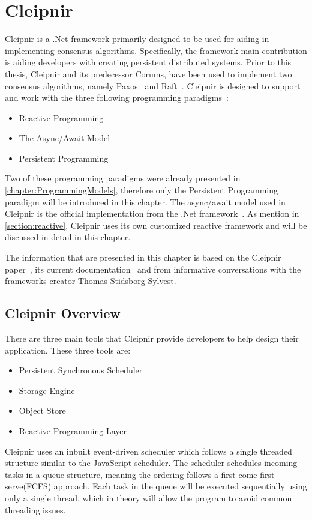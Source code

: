 \chapter{Cleipnir}
\label{chapter:Cleipnir}

Cleipnir is a .Net framework primarily designed to be used for aiding in implementing consensus algorithms. Specifically, the framework main contribution is aiding developers with creating persistent distributed systems. Prior to this thesis, Cleipnir and its predecessor Corums, have been used to implement two consensus algorithms, namely Paxos~\cite[p.~32-38]{PAPER:EivindPaper} and Raft~\cite[p.~13-15]{PAPER:PaxosCleipnir}. 
Cleipnir is designed to support and work with the three following programming paradigms~\cite[p.~5]{PAPER:PaxosCleipnir}: 
\begin{itemize}
\item {Reactive Programming}
\item {The Async/Await Model}
\item {Persistent Programming}
\end{itemize}

Two of these programming paradigms were already presented in \autoref{chapter:ProgrammingModels}, therefore only the Persistent Programming paradigm will be introduced in this chapter. The async/await model used in Cleipnir is the official implementation from the .Net framework~\cite{DOC:AsyncAwait}. As mention in \autoref{section:reactive}, Cleipnir uses its own customized reactive framework and will be discussed in detail in this chapter.

The information that are presented in this chapter is based on the Cleipnir paper~\cite{PAPER:PaxosCleipnir}, its current documentation~\cite{DOC:Cleipnir} and from informative conversations with the frameworks creator Thomas Stidsborg Sylvest.

\section{Cleipnir Overview}

There are three main tools that Cleipnir provide developers to help design their application.
These three tools are:
\begin{itemize}
	\item{Persistent Synchronous Scheduler}
	\item{Storage Engine}
	\item{Object Store}
	\item{Reactive Programming Layer}
\end{itemize}
Cleipnir uses an inbuilt event-driven scheduler which follows a single threaded structure similar to the JavaScript scheduler\cites[p.~7]{PAPER:PaxosCleipnir}{WEB:CleipnirScheduler}. The scheduler schedules incoming tasks in a queue structure, meaning the ordering follows a first-come first-serve(FCFS)\cite{WEB:FIFO} approach. Each task in the queue will be executed sequentially using only a single thread, which in theory will allow the program to avoid common threading issues\cite[p.~7]{PAPER:PaxosCleipnir}. %

